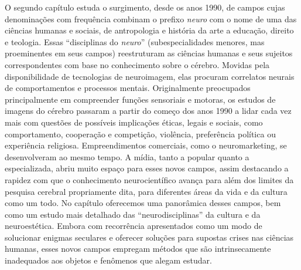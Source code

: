 O segundo capítulo estuda o surgimento, desde os anos 1990, de campos
cujas denominações com frequência combinam o prefixo \emph{neuro} com o
nome de uma das ciências humanas e sociais, de antropologia e história
da arte a educação, direito e teologia. Essas ``disciplinas do
\emph{neuro}'' (subespecialidades menores, mas proeminentes em seus
campos) reestruturam as ciências humanas e seus sujeitos correspondentes
com base no conhecimento sobre o cérebro. Movidas pela disponibilidade
de tecnologias de neuroimagem, elas procuram correlatos neurais de
comportamentos e processos mentais. Originalmente preocupados
principalmente em compreender funções sensoriais e motoras, os estudos
de imagens do cérebro passaram a partir do começo dos anos 1990 a lidar
cada vez mais com questões de possíveis implicações éticas, legais e
sociais, como comportamento, cooperação e competição, violência,
preferência política ou experiência religiosa. Empreendimentos
comerciais, como o neuromarketing, se desenvolveram ao mesmo tempo. A
mídia, tanto a popular quanto a especializada, abriu muito espaço para
esses novos campos, assim destacando a rapidez com que o
conhecimento neurocientífico avança para além dos limites da pesquisa
cerebral propriamente dita, para diferentes áreas da vida e da cultura
como um todo. No capítulo oferecemos uma panorâmica desses campos, bem
como um estudo mais detalhado das ``neurodisciplinas'' da cultura e da
neuroestética. Embora com recorrência apresentados como um modo de
solucionar enigmas seculares e oferecer soluções para supostas crises
nas ciências humanas, esses novos campos empregam métodos que são
intrinsecamente inadequados aos objetos e fenômenos que alegam estudar.


